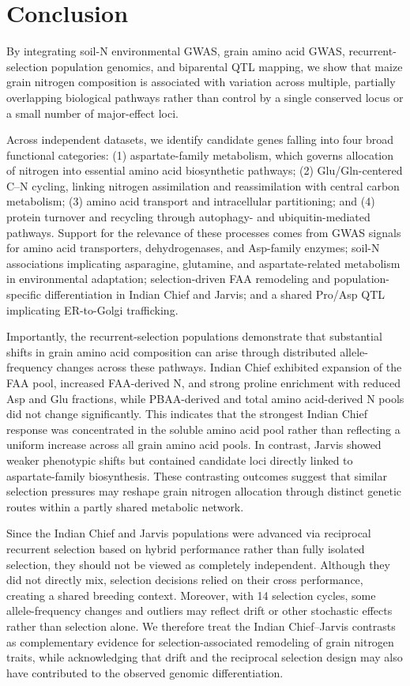 \section{Conclusion}\label{sec13}

By integrating soil-N environmental GWAS, grain amino acid GWAS, recurrent-selection population genomics, and biparental QTL mapping, we show that maize grain nitrogen composition is associated with variation across multiple, partially overlapping biological pathways rather than control by a single conserved locus or a small number of major-effect loci.

\quad Across independent datasets, we identify candidate genes falling into four broad functional categories: (1) aspartate-family metabolism, which governs allocation of nitrogen into essential amino acid biosynthetic pathways; (2) Glu/Gln-centered C--N cycling, linking nitrogen assimilation and reassimilation with central carbon metabolism; (3) amino acid transport and intracellular partitioning; and (4) protein turnover and recycling through autophagy- and ubiquitin-mediated pathways. Support for the relevance of these processes comes from GWAS signals for amino acid transporters, dehydrogenases, and Asp-family enzymes; soil-N associations implicating asparagine, glutamine, and aspartate-related metabolism in environmental adaptation; selection-driven FAA remodeling and population-specific differentiation in Indian Chief and Jarvis; and a shared Pro/Asp QTL implicating ER-to-Golgi trafficking.

\quad Importantly, the recurrent-selection populations demonstrate that substantial shifts in grain amino acid composition can arise through distributed allele-frequency changes across these pathways. Indian Chief exhibited expansion of the FAA pool, increased FAA-derived N, and strong proline enrichment with reduced Asp and Glu fractions, while PBAA-derived and total amino acid-derived N pools did not change significantly. This indicates that the strongest Indian Chief response was concentrated in the soluble amino acid pool rather than reflecting a uniform increase across all grain amino acid pools. In contrast, Jarvis showed weaker phenotypic shifts but contained candidate loci directly linked to aspartate-family biosynthesis. These contrasting outcomes suggest that similar selection pressures may reshape grain nitrogen allocation through distinct genetic routes within a partly shared metabolic network.

Since the Indian Chief and Jarvis populations were advanced via reciprocal recurrent selection based on hybrid performance rather than fully isolated selection, they should not be viewed as completely independent. Although they did not directly mix, selection decisions relied on their cross performance, creating a shared breeding context. Moreover, with 14 selection cycles, some allele-frequency changes and outliers may reflect drift or other stochastic effects rather than selection alone. We therefore treat the Indian Chief–Jarvis contrasts as complementary evidence for selection-associated remodeling of grain nitrogen traits, while acknowledging that drift and the reciprocal selection design may also have contributed to the observed genomic differentiation.


